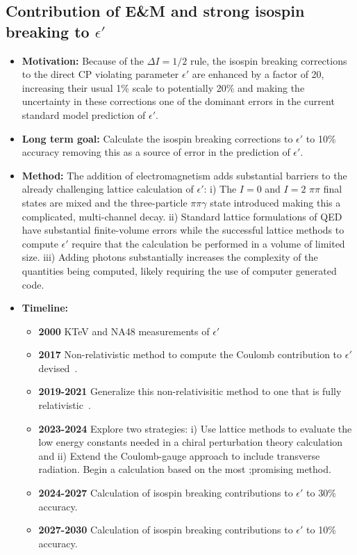 \documentclass[12pt,hyperpdf]{article}
\begin{document}
\subsection{Contribution of E\&M and strong isospin breaking to $\epsilon'$}
\begin{itemize}
    \item{\bf Motivation:} Because of the $\Delta I=1/2$ rule, the isospin breaking corrections to the direct CP violating parameter $\epsilon'$ are enhanced by a factor of 20, increasing their usual 1\% scale to potentially 20\% and making the uncertainty in these corrections one of the dominant errors in the current standard model prediction of $\epsilon'$.
    \item{\bf Long term goal:} Calculate the isospin breaking corrections to $\epsilon'$ to 10\% accuracy removing this as a source of error in the prediction of $\epsilon'$.
    \item{\bf Method:} The addition of electromagnetism adds substantial barriers to the already challenging lattice calculation of $\epsilon'$:  i) The $I=0$ and $I=2$ $\pi\pi$ final states are mixed and the three-particle $\pi\pi\gamma$ state introduced making this a complicated, multi-channel decay. ii)  Standard lattice formulations of QED have substantial finite-volume errors while the successful lattice methods to compute $\epsilon'$ require that the calculation be performed in a volume of limited size.  iii) Adding photons substantially increases the complexity of the quantities being computed, likely requiring the use of computer generated code.
\item{\bf Timeline:}
\begin{itemize}
    \item{\bf 2000} KTeV and NA48 measurements of $\epsilon'$
    \item{\bf 2017} Non-relativistic method to compute the Coulomb contribution to $\epsilon'$ devised~\cite{Christ:2017pze}.
    \item{\bf 2019-2021} Generalize this non-relativisitic method to one that is fully relativistic~\cite{Christ:2021guf}.
    \item{\bf 2023-2024} Explore two strategies:  i) Use lattice methods to evaluate the low energy constants needed in a chiral perturbation theory calculation~\cite{Cirigliano:2019cpi} and ii) Extend the Coulomb-gauge approach to include transverse radiation.  Begin a calculation based on the most ;promising method.
    \item{\bf 2024-2027} Calculation of isospin breaking contributions to $\epsilon'$ to 30\% accuracy.
    \item{\bf 2027-2030} Calculation of isospin breaking contributions to $\epsilon'$ to 10\% accuracy.
\end{itemize}
\end{itemize}
\end{document}
